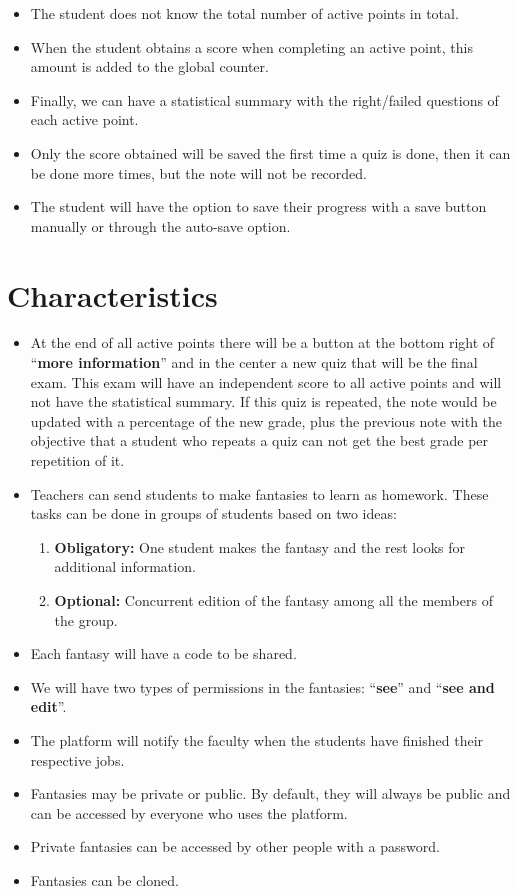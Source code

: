 \begin{itemize}
\begin{itemize}
		\item The student does not know the total number of active points in total.
		\item When the student obtains a score when completing an active point, this amount is added to the global counter.
		\item Finally, we can have a statistical summary with the right/failed questions of each active point.
		\item Only the score obtained will be saved the first time a quiz is done, then it can be done more times, but the note will not be recorded.
		\item The student will have the option to save their progress with a save button manually or through the auto-save option.
	\end{itemize}
\end{itemize}

\section{Characteristics}
\begin{itemize}
	\item At the end of all active points there will be a button at the bottom right of ``\textbf{more information}'' and in the center a new quiz that will be the final exam. This exam will have an independent score to all active points and will not have the statistical summary. If this quiz is repeated, the note would be updated with a percentage of the new grade, plus the previous note with the objective that a student who repeats a quiz can not get the best grade per repetition of it.
	\item Teachers can send students to make fantasies to learn as homework. These tasks can be done in groups of students based on two ideas:
	\begin{enumerate}
		\item \textbf{Obligatory:} One student makes the fantasy and the rest looks for additional information.
		\item \textbf{Optional:} Concurrent edition of the fantasy among all the members of the group.
	\end{enumerate}
	\item Each fantasy will have a code to be shared.
	\item We will have two types of permissions in the fantasies: ``\textbf{see}'' and ``\textbf{see and edit}''.
	\item The platform will notify the faculty when the students have finished their respective jobs.
	\item Fantasies may be private or public. By default, they will always be public and can be accessed by everyone who uses the platform.
	\item Private fantasies can be accessed by other people with a password.
	\item Fantasies can be cloned.
\end{itemize}

